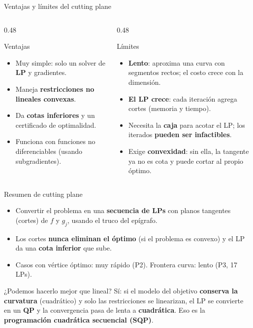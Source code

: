 \documentclass[aspectratio=169]{beamer}
\begin{document}
\begin{frame}{Ventajas y límites del cutting plane}
  \begin{columns}[T]
    \begin{column}{0.48\textwidth}
      \begin{block}{Ventajas}
        \begin{itemize}
          \item Muy simple: solo un solver de \textbf{LP} y gradientes.
          \item Maneja \textbf{restricciones no lineales convexas}.
          \item Da \textbf{cotas inferiores} y un certificado de optimalidad.
          \item Funciona con funciones no diferenciables (usando subgradientes).
        \end{itemize}
      \end{block}
    \end{column}
    \begin{column}{0.48\textwidth}
      \begin{block}{Límites}
        \begin{itemize}
          \item \textbf{Lento}: aproxima una curva con segmentos rectos; el costo crece con la dimensión.
          \item \textbf{El LP crece}: cada iteración agrega cortes (memoria y tiempo).
          \item Necesita la \textbf{caja} para acotar el LP; los iterados \textbf{pueden ser infactibles}.
          \item Exige \textbf{convexidad}: sin ella, la tangente ya no es cota y puede cortar al propio óptimo.
        \end{itemize}
      \end{block}
    \end{column}
  \end{columns}
\end{frame}

\begin{frame}{Resumen de cutting plane}
  \begin{itemize}
    \item Convertir el problema en una \textbf{secuencia de LPs} con planos tangentes (cortes) de $f$ y $g_j$, usando el truco del epígrafo.
    \item Los cortes \textbf{nunca eliminan el óptimo} (si el problema es convexo) y el LP da una \textbf{cota inferior} que sube.
    \item Casos con vértice óptimo: muy rápido (P2). Frontera curva: lento (P3, 17 LPs).
  \end{itemize}
  \begin{alertblock}{¿Podemos hacerlo mejor que lineal?}
    Sí: si el modelo del objetivo \textbf{conserva la curvatura} (cuadrático) y solo las restricciones se linearizan, el LP se convierte en un \textbf{QP} y la convergencia pasa de lenta a \textbf{cuadrática}. Eso es la \textbf{programación cuadrática secuencial (SQP)}.
  \end{alertblock}
\end{frame}
\end{document}
